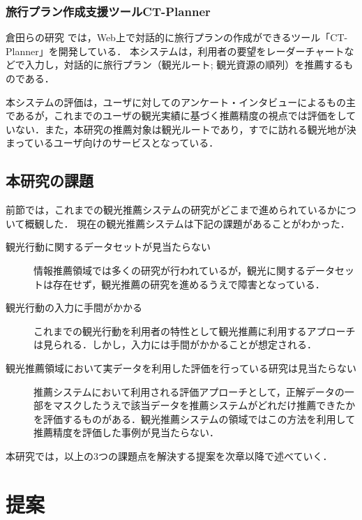 \documentclass{jsarticle}
\begin{document}
\subsubsection{旅行プラン作成支援ツールCT-Planner}

倉田らの研究\cite{ctplanner}\cite{ctplanner2}\cite{ctplanner3}\cite{ctplanner3b}\cite{ctplanner4}\cite{ctplanner5} では，Web上で対話的に旅行プランの作成ができるツール「CT-Planner\cite{ctplanner_web}」を開発している．
本システムは，利用者の要望をレーダーチャートなどで入力し，対話的に旅行プラン（観光ルート; 観光資源の順列）を推薦するものである．

本システムの評価は，ユーザに対してのアンケート・インタビューによるもの主であるが，これまでのユーザの観光実績に基づく推薦精度の視点では評価をしていない．また，本研究の推薦対象は観光ルートであり，すでに訪れる観光地が決まっているユーザ向けのサービスとなっている．

\subsection{本研究の課題}
\label{problem}

前節では，これまでの観光推薦システムの研究がどこまで進められているかについて概観した．
現在の観光推薦システムは下記の課題があることがわかった．

\begin{description}
\item[観光行動に関するデータセットが見当たらない]
       情報推薦領域では多くの研究が行われているが，観光に関するデータセットは存在せず，観光推薦の研究を進めるうえで障害となっている．
\item[観光行動の入力に手間がかかる]
       これまでの観光行動を利用者の特性として観光推薦に利用するアプローチは見られる．しかし，入力には手間がかかることが想定される．
\item[観光推薦領域において実データを利用した評価を行っている研究は見当たらない]
       推薦システムにおいて利用される評価アプローチとして，正解データの一部をマスクしたうえで該当データを推薦システムがどれだけ推薦できたかを評価するものがある．観光推薦システムの領域ではこの方法を利用して推薦精度を評価した事例が見当たらない．
\end{description}

本研究では，以上の3つの課題点を解決する提案を次章以降で述べていく．

\section{提案}
\end{document}
